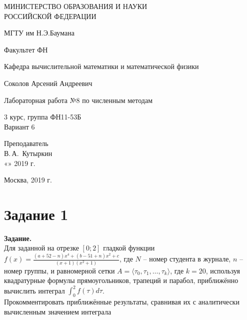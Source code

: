 \documentclass[14pt,a4paper]{scrartcl}
\begin{document}
	\begin{titlepage}
	\begin{center}
		\large
		МИНИСТЕРСТВО ОБРАЗОВАНИЯ И НАУКИ\\ РОССИЙСКОЙ ФЕДЕРАЦИИ
		
		\vspace{0.5cm}
		
		МГТУ им Н.Э.Баумана
		\vspace{0.25cm}
		
		Факультет ФН
		
		Кафедра вычислительной математики и математической физики
		\vfill
		
		
		Соколов Арсений Андреевич\\
		\vfill
		
		
		{\LARGE Лабораторная работа №8 по численным методам\\[2mm]
		}
		\bigskip
		
		3 курс, группа ФН11-53Б\\
		Вариант 6
	\end{center}
	\vfill
	
	\newlength{\ML}
	\hfill\begin{minipage}{0.4\textwidth}
		Преподаватель\\
		\underline{\hspace{3cm}} В.\,А.~Кутыркин\\
		«\underline{\hspace{0.7cm}}» \underline{\hspace{1.71cm}} 2019 г.
	\end{minipage}%
	\bigskip
	
	
	\vfill
	
	\begin{center}
		Москва, 2019 г.
	\end{center}
\end{titlepage}

\section*{Задание 1}
\textbf{Задание.}\\
Для заданной на отрезке $[0;2]$ гладкой функции $f(x)=\frac{(a+52-n) x^{4}+(b-51+n) x^{2}+c}{(x+1)\left(x^{2}+1\right)}$, где $N$ -- номер студента в журнале, $n$ -- номер группы, и равномерной сетки $A = \langle \tau_0, \tau_1, \ldots, \tau_k \rangle$, где $k = 20$, используя квадратурные формулы прямоугольников, трапеций и парабол, приближённо вычислить интеграл $\int_{0}^{2}f(\tau)d\tau$.\\
Прокомментировать приближённые результаты, сравнивая их с
аналитически вычисленным значением интеграла
\end{document}

